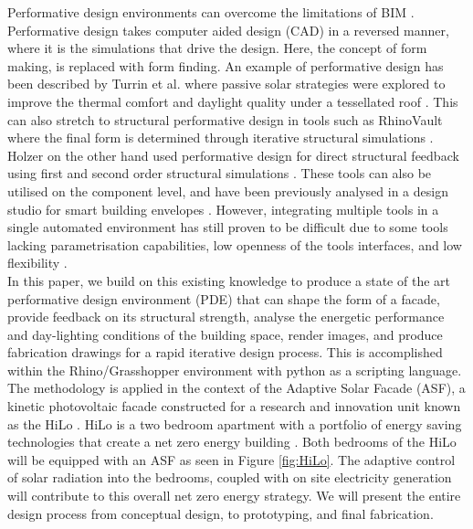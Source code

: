 Performative design environments can overcome the limitations of BIM \cite{oxman2008performance}. Performative design takes computer aided design (CAD) in a reversed manner, where it is the simulations that drive the design. Here, the concept of form making, is replaced with form finding. An example of performative design has been described by Turrin et al. where passive solar strategies were explored to improve the thermal comfort and daylight quality under a tessellated roof \cite{turrin2012performative}. This can also stretch to structural performative design in tools such as RhinoVault where the final form is determined through iterative structural simulations \cite{Rippmann2012}. Holzer on the other hand used performative design for direct structural feedback using first and second order structural simulations \cite{holzer2016design}. These tools can also be utilised on the component level, and have been previously analysed in a design studio for smart building envelopes \cite{kim2017exploratory}. However, integrating multiple tools in a single automated environment has still proven to be difficult due to some tools lacking parametrisation capabilities, low openness of the tools interfaces, and low flexibility \cite{diaz2017multidisciplinary,negendahl2015building}.\\

In this paper, we build on this existing knowledge to produce a state of the art performative design environment (PDE) that can shape the form of a facade, provide feedback on its structural strength, analyse the energetic performance and day-lighting conditions of the building space, render images, and produce fabrication drawings for a rapid iterative design process. This is accomplished within the Rhino/Grasshopper environment with python as a scripting language. The methodology is applied in the context of the Adaptive Solar Facade (ASF), a kinetic photovoltaic facade constructed for a research and innovation unit known as the HiLo \cite{Block2017}. HiLo is a two bedroom apartment with a portfolio of energy saving technologies that create a net zero energy building \cite{lydon2017coupling}. Both bedrooms of the HiLo will be equipped with an ASF as seen in Figure \ref{fig:HiLo}. The adaptive control of solar radiation into the bedrooms, coupled with on site electricity generation will contribute to this overall net zero energy strategy.  We will present the entire design process from conceptual design, to prototyping, and final fabrication. 




